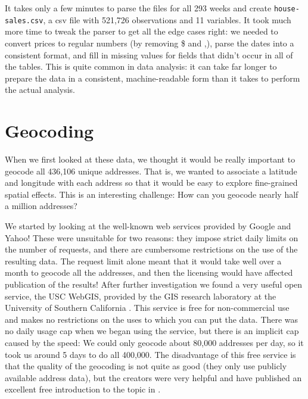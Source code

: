\documentclass[oneside]{article}
\begin{document}
It takes only a few minutes to parse the files for all 293 weeks and create {\tt house-sales.csv}, a csv file with 521,726 observations and 11 variables.  It took much more time to tweak the parser to get all the edge cases right: we needed to convert prices to regular numbers (by removing \$ and ,), parse the dates into a consistent format, and fill in missing values for fields that didn't occur in all of the tables.  This is quite common in data analysis: it can take far longer to prepare the data in a consistent, machine-readable form than it takes to perform the actual analysis.

\section{Geocoding} 

When we first looked at these data, we thought it would be really important to geocode all 436,106 unique addresses.  That is, we wanted to associate a latitude and longitude with each address so that it would be easy to explore fine-grained spatial effects. This is an interesting challenge: How can you geocode nearly half a million addresses? 

We started by looking at the well-known web services provided by Google and Yahoo! These were unsuitable for two reasons: they impose strict daily limits on the number of requests, and there are cumbersome restrictions on the use of the resulting data.  The request limit alone meant that it would take well over a month to geocode all the addresses, and then the licensing would have affected publication of the results! After further investigation we found a very useful open service, the USC WebGIS, provided by the GIS research laboratory at the University of Southern California \citep{uscgis}.  This service is free for non-commercial use and makes no restrictions on the uses to which you can put the data.  There was no daily usage cap when we began using the service, but there is an implicit cap caused by the speed: We could only geocode about 80,000 addresses per day, so it took us around 5 days to do all 400,000.  The disadvantage of this free service is that the quality of the geocoding is not quite as good (they only use publicly available address data), but the creators were very helpful and have published an excellent free introduction to the topic in \citet{goldberg:2008}.  
\end{document}
